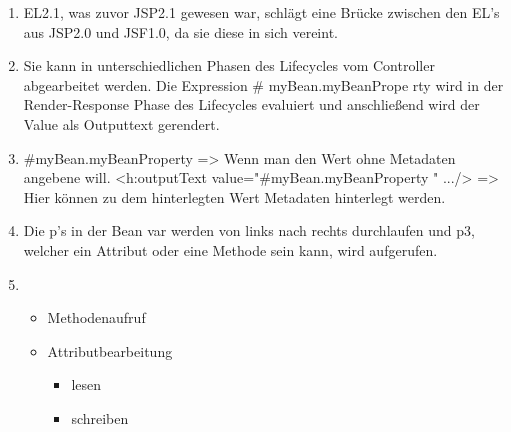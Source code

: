 \documentclass[a4paper,letterpaper,10pt,ngerman]{scrartcl}
\begin{document}
%
%
\begin{enumerate}
	\item EL2.1, was zuvor JSP2.1 gewesen war, schlägt eine Brücke zwischen den EL's aus JSP2.0 und JSF1.0, da sie diese in sich vereint.
	
	\item Sie kann in unterschiedlichen Phasen des Lifecycles vom Controller abgearbeitet werden. Die Expression \#{ myBean.myBeanPrope
rty } wird in der  Render-Response Phase des Lifecycles evaluiert und anschließend wird der Value als Outputtext gerendert.

	\item \#{myBean.myBeanProperty} => Wenn man den Wert ohne Metadaten angebene will.
    <h:outputText value="\#{myBean.myBeanProperty }" .../> => Hier können zu dem hinterlegten Wert Metadaten hinterlegt werden.
    
    \item Die p's in der Bean var werden von links nach rechts durchlaufen und p3, welcher ein Attribut oder eine Methode sein kann, wird aufgerufen.
    
    \item 
    \begin{itemize}
    	\item Methodenaufruf
    	\item Attributbearbeitung
    	\begin{itemize}
    		\item lesen
    		\item schreiben
    	\end{itemize}
    \end{itemize} 
    

\end{enumerate}
\end{document}
